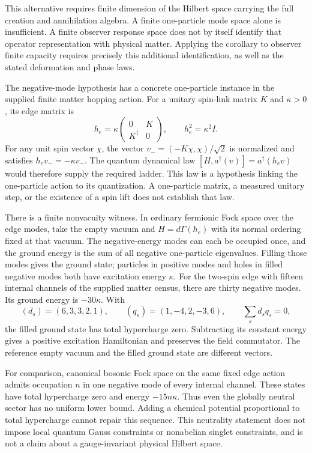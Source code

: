 This alternative requires finite dimension of the Hilbert space carrying
the full creation and annihilation algebra. A finite one-particle mode
space alone is insufficient.
A finite observer response space does not by itself identify that
operator representation with physical matter. Applying the corollary to
observer finite capacity requires precisely this additional identification,
as well as the stated deformation and phase laws.

The negative-mode hypothesis has a concrete one-particle instance in the
supplied finite matter hopping action. For a unitary spin-link matrix $K$
and $\kappa>0$, its edge matrix is
\[
 h_e=\kappa\begin{pmatrix}0&K\\K^\dagger&0\end{pmatrix},
 \qquad h_e^2=\kappa^2I.
\]
For any unit spin vector $\chi$, the vector
$v_-=(-K\chi,\chi)/\sqrt2$ is normalized and satisfies
$h_ev_-=-\kappa v_-$. The quantum dynamical law
$[H,a^\dagger(v)]=a^\dagger(h_ev)$ would therefore supply the
required ladder. This law is a hypothesis linking the one-particle
action to its quantization. A one-particle matrix, a measured unitary
step, or the existence of a spin lift does not establish that law.

There is a finite nonvacuity witness. In ordinary fermionic Fock space
over the edge modes, take the empty vacuum and
$H=d\Gamma(h_e)$ with its normal ordering fixed at that vacuum.
The negative-energy modes can each be occupied once, and the ground
energy is the sum of all negative one-particle eigenvalues. Filling those
modes gives the ground state; particles in positive modes and holes in
filled negative modes both have excitation energy $\kappa$.
For the two-spin edge with fifteen internal channels of the supplied
matter census, there are thirty negative modes. Its ground energy is
$-30\kappa$. With
\[
 (d_s)=(6,3,3,2,1),\qquad (q_s)=(1,-4,2,-3,6),
 \qquad \sum_s d_sq_s=0,
\]
the filled ground state has total hypercharge zero. Subtracting its
constant energy gives a positive excitation Hamiltonian and preserves
the field commutator. The reference empty vacuum and the filled ground
state are different vectors.

For comparison, canonical bosonic Fock space on the same fixed edge
action admits occupation $n$ in one negative mode of every internal
channel. These states have total hypercharge zero and energy
$-15n\kappa$. Thus even the globally neutral sector has no uniform
lower bound. Adding a chemical potential proportional to total
hypercharge cannot repair this sequence. This neutrality statement does
not impose local quantum Gauss constraints or nonabelian singlet
constraints, and is not a claim about a gauge-invariant physical Hilbert
space.

